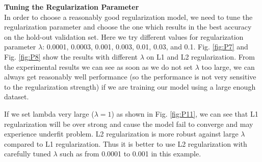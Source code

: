 \documentclass{article} %
\begin{document}
\textbf{Tuning the Regularization Parameter}\\
In order to choose a reasonably good regularization model, we need to tune the regularization parameter and choose the one which results in the best accuracy on the hold-out validation set. Here we try different values for regularization parameter $\lambda$: 0.0001, 0.0003, 0.001, 0.003, 0.01, 0.03, and 0.1. Fig. \ref{fig:P7} and Fig. \ref{fig:P8} show the results with different $\lambda$ on L1 and L2 regularization. From the experimental results we can see as soon as we do not set $\lambda$ too large, we can always get reasonably well performance (so the performance is not very sensitive to the regularization strength) if we are training our model using a large enough dataset. 

If we set lambda very large ($\lambda=1$) as shown in Fig. \ref{fig:P11}, we can see that L1 regularization will be over strong and cause the model fail to converge and may experience underfit problem. L2 regularization is more robust against large $\lambda$ compared to L1 regularization. Thus it is better to use L2 regularization with carefully tuned $\lambda$ such as from 0.0001 to 0.001 in this example.
\end{document}
